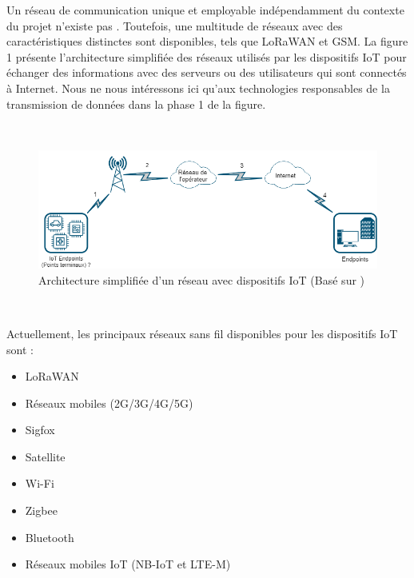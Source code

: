 \noindent
Un réseau de communication unique et employable indépendamment du contexte du projet n’existe pas \cite{vannieuwenborg_iot}. Toutefois, une multitude de réseaux avec des caractéristiques distinctes sont disponibles, tels que LoRaWAN et GSM. La figure 1 présente l’architecture simplifiée des réseaux utilisés par les dispositifs IoT pour échanger des informations avec des serveurs ou des utilisateurs qui sont connectés à Internet. Nous ne nous intéressons ici qu’aux technologies responsables de la transmission de données dans la phase 1 de la figure.

~

\begin{figure}[ht!]
  \includegraphics[width=\textwidth]{img/state_of_the_art/network_iot.png}
  \caption{Architecture simplifiée d'un réseau avec dispositifs IoT (Basé sur \cite{sanchez2016state, mekki2018overview})}
  \label{fig:network_archi}
\end{figure}

~

\noindent
Actuellement, les principaux réseaux sans fil disponibles pour les dispositifs IoT sont :

\begin{itemize}
  \item LoRaWAN
  \item Réseaux mobiles (2G/3G/4G/5G)
  \item Sigfox
  \item Satellite
  \item Wi-Fi
  \item Zigbee
  \item Bluetooth
  \item Réseaux mobiles IoT (NB-IoT et LTE-M)
\end{itemize}

~

